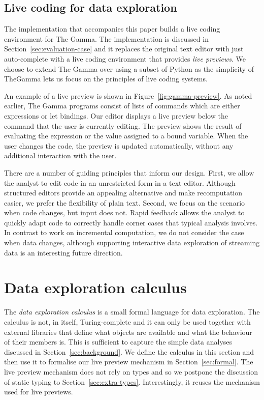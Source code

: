 \documentclass[english,submission]{programming}
\theoremstyle{plain}
\theoremstyle{definition}
\begin{document}

\subsection{Live coding for data exploration}

The implementation that accompanies this paper builds a live coding environment for The Gamma.
The implementation is discussed in Section~\ref{sec:evaluation-case} and it replaces
the original text editor with just auto-complete with a live coding environment
that provides \emph{live previews}. We choose to extend The Gamma over using a subset of Python
as the simplicity of TheGamma lets us focus on the principles of live coding systems.

An example of a live preview is shown in Figure~\ref{fig:gamma-preview}. As noted earlier, The
Gamma programs consist of lists of commands which are either expressions or let bindings. Our
editor displays a live preview below the command that the user is currently editing. The preview
shows the result of evaluating the expression or the value assigned to a bound variable. When the
user changes the code, the preview is updated automatically, without any additional interaction
with the user.

There are a number of guiding principles that inform our design. First, we allow the analyst
to edit code in an unrestricted form in a text editor. Although structured editors provide an
appealing alternative and make recomputation easier, we prefer the flexibility of plain text.
Second, we focus on the scenario when code changes, but input
does not. Rapid feedback allows the analyst to quickly adapt code to correctly handle
corner cases that typical analysis involves. In contrast to work on incremental computation,
we do not consider the case when data changes, although supporting interactive data exploration
of streaming data is an interesting future direction.


\section{Data exploration calculus}
\label{sec:calculus}

The \emph{data exploration calculus} is a small formal language for data exploration. The calculus
is not, in itself, Turing-complete and it can only be used together with external libraries that
define what objects are available and what the behaviour of their members is. This is
sufficient to capture the simple data analyses discussed in Section~\ref{sec:background}. We
define the calculus in this section and then use it to formalise our live preview
mechanism in Section~\ref{sec:formal}.
%
The live preview mechanism does not rely on types and so we postpone the discussion of static
typing to Section~\ref{sec:extra-types}. Interestingly, it reuses the mechanism used for live
previews.
\end{document}
